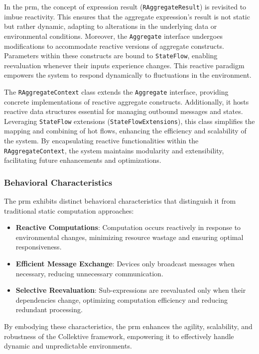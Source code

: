In the \ac{prm}, the concept of expression result (\texttt{RAggregateResult}) is revisited to imbue reactivity. This ensures that the aggregate expression's result is not static but rather dynamic, adapting to alterations in the underlying data or environmental conditions. Moreover, the \texttt{Aggregate} interface undergoes modifications to accommodate reactive versions of aggregate constructs. Parameters within these constructs are bound to \texttt{StateFlow}, enabling reevaluation whenever their inputs experience changes. This reactive paradigm empowers the system to respond dynamically to fluctuations in the environment.

The \texttt{RAggregateContext} class extends the \texttt{Aggregate} interface, providing concrete implementations of reactive aggregate constructs. Additionally, it hosts reactive data structures essential for managing outbound messages and states. Leveraging \texttt{StateFlow} extensions (\texttt{StateFlowExtensions}), this class simplifies the mapping and combining of hot flows, enhancing the efficiency and scalability of the system. By encapsulating reactive functionalities within the \texttt{RAggregateContext}, the system maintains modularity and extensibility, facilitating future enhancements and optimizations.

\subsubsection{Behavioral Characteristics}

The \ac{prm} exhibits distinct behavioral characteristics that distinguish it from traditional static computation approaches:

\begin{itemize}
    \item \textbf{Reactive Computations}: Computation occurs reactively in response to environmental changes, minimizing resource wastage and ensuring optimal responsiveness.
    \item \textbf{Efficient Message Exchange}: Devices only broadcast messages when necessary, reducing unnecessary communication.
    \item \textbf{Selective Reevaluation}: Sub-expressions are reevaluated only when their dependencies change, optimizing computation efficiency and reducing redundant processing.
\end{itemize}

By embodying these characteristics, the \ac{prm} enhances the agility, scalability, and robustness of the Collektive framework, empowering it to effectively handle dynamic and unpredictable environments.

